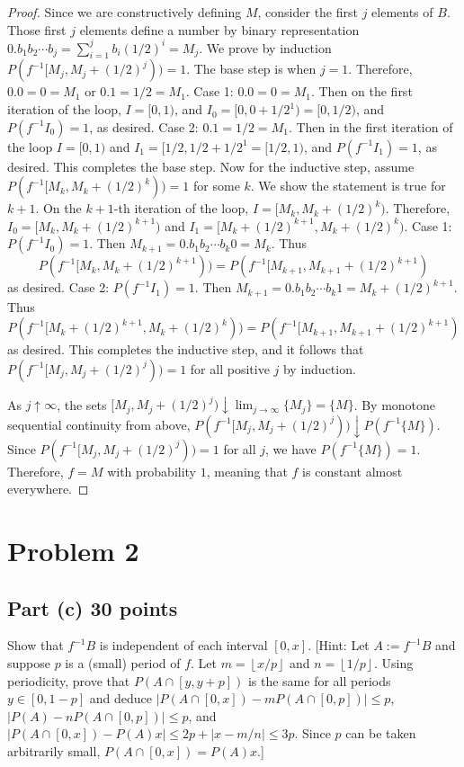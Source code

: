\documentclass[letterpaper, 12pt]{article}
\newcommand{\lf}{\left\lfloor}
\newcommand{\rf}{\right\rfloor}
\begin{document}
\begin{proof}
Since we are constructively defining $M$, consider the first $j$ elements of $B$. 
Those first $j$ elements define a number by binary representation $0.b_1b_2\cdots b_j = \sum_{i=1}^j b_i (1/2)^i = M_j$. 
We prove by induction $P(f^{-1} [M_j,M_j + (1/2)^j) ) = 1$. 
The base step is when $j = 1$. 
Therefore, $0.0 = 0 = M_1$ or $0.1 = 1/2 = M_1$. 
Case 1: $0.0=0=M_1$. Then on the first iteration of the loop, $I = [0,1)$, and $I_0 = [0,0 +1/2^1) = [0,1/2)$, and $P(f^{-1}I_0) = 1$, as desired. Case 2: $0.1 = 1/2 = M_1$. Then in the first iteration of the loop $I = [0,1)$ and $I_1 = [1/2, 1/2 + 1/2^1 = [1/2,1)$, and $P(f^{-1}I_1) = 1$, as desired. This completes the base step. Now for the inductive step, assume $P(f^{-1}[M_k, M_k + (1/2)^k )) = 1$ for some $k$. We show the statement is true for $k+1$. On the $k + 1$-th iteration of the loop, $I = [M_k, M_k + (1/2)^k )$. Therefore, $I_0 = [M_k, M_k + (1/2)^{k+1})$ and $I_1 = [M_k + (1/2)^{k+1}, M_k + (1/2)^k)$. Case 1: $P(f^{-1}I_0) = 1$. Then $M_{k+1} = 0.b_1b_2\cdots b_k0 = M_k$. Thus 
\[
P(f^{-1} [M_k, M_k + (1/2)^{k+1})) = P(f^{-1}[M_{k+1}, M_{k+1} + (1/2)^{k+1})
\]
as desired. Case 2: $P(f^{-1}I_1) = 1$. Then $M_{k+1} = 0.b_1b_2\cdots b_k1 = M_k + (1/2)^{k+1}$. Thus
\[
P(f^{-1}[M_k + (1/2)^{k+1}, M_k + (1/2)^k)) = P(f^{-1}[M_{k+1},M_{k+1} + (1/2)^{k+1})
\]
as desired. This completes the inductive step, and it follows that $P(f^{-1} [M_j,M_j + (1/2)^j) ) = 1$ for all positive $j$ by induction.

As $j \uparrow \infty$, the sets $[M_j, M_j + (1/2)^j) \downarrow \lim_{j \to \infty}\{M_j\} = \{M\}$. By monotone sequential continuity from above, $P(f^{-1}[M_j, M_j + (1/2)^j)) \downarrow P(f^{-1}\{M\})$. Since  $P(f^{-1}[M_j, M_j + (1/2)^j)) = 1$ for all $j$, we have $P(f^{-1}\{M\}) = 1$. Therefore, $f = M$ with probability $1$, meaning that $f$ is constant almost everywhere.
\end{proof}

\pagebreak

\section*{Problem 2}
\subsection*{Part (c) 30 points}
Show that $f^{-1}B$ is independent of each interval $[0,x]$. 
[{\sc Hint:} Let $A:= f^{-1}B$ and suppose $p$ is a (small) period of $f$.  
Let $m = \lf x/p \rf$ and $n = \lf 1/p \rf$.  
Using periodicity, prove that $P(A \cap [y,y+p])$ is the same for all periods $y \in [0,1-p]$ and deduce $|P(A \cap [0,x]) - m P(A \cap [0,p])| \leq p$, $|P(A) - nP(A \cap [0,p])| \leq p$, and $|P(A \cap [0,x]) - P(A)x| \leq 2p + |x - m/n| \leq 3p$.  Since $p$ can be taken
arbitrarily small, $P(A \cap [0,x]) = P(A)x$.]
\end{document}
